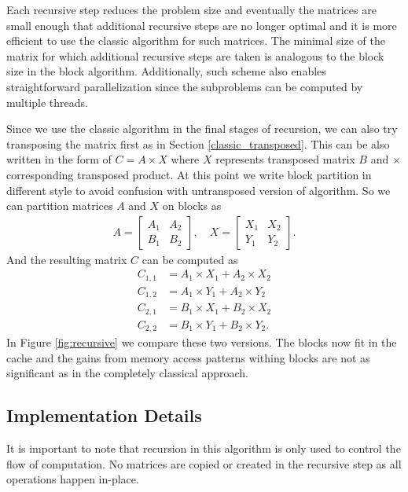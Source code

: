 \documentclass[a4paper,11pt]{article}
\begin{document}
Each recursive step reduces the problem size and eventually the matrices are small enough that additional recursive steps are no longer optimal and it is more efficient to use the classic algorithm for such matrices. The minimal size of the matrix for which additional recursive steps are taken is analogous to the block size in the block algorithm. Additionally, such scheme also enables straightforward parallelization since the subproblems can be computed by multiple threads.

Since we use the classic algorithm in the final stages of recursion, we can also try transposing the matrix first as in Section \ref{classic_transposed}. 
This can be also written in the form of $C = A \times X$ where $X$ represents transposed matrix $B$ and $\times$ corresponding transposed product. 
At this point we write block partition in different style to avoid confusion with untransposed version of algorithm. 
So we can partition matrices $A$ and $X$ on blocks as
\begin{align*}
A = 
\begin{bmatrix}
A_{1} & A_{2} \\
B_{1} & B_{2}
\end{bmatrix},
\quad
X = 
\begin{bmatrix}
X_{1} & X_{2} \\
Y_{1} & Y_{2}
\end{bmatrix}
.
\end{align*}
And the resulting matrix $C$ can be computed as
\begin{align*}
C_{1,1} &= A_{1} \times X_{1} + A_{2}  \times X_{2} \\
C_{1,2} &= A_{1} \times Y_{1} + A_{2}  \times Y_{2} \\
C_{2,1} &= B_{1} \times X_{1} + B_{2}  \times X_{2} \\
C_{2,2} &= B_{1} \times Y_{1} + B_{2}  \times Y_{2}.
\end{align*}
In Figure \ref{fig:recursive} we compare these two versions. The blocks now fit in the cache and the gains from memory access patterns withing blocks are not as significant as in the completely classical approach.

\subsection{Implementation Details} 
It is important to note that recursion in this algorithm is only used to control the flow of computation. No matrices are copied or created in the recursive step as all operations happen in-place. 
\end{document}
